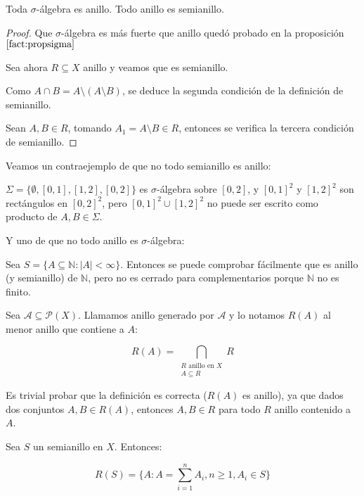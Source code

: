 \begin{fact}
 Toda $\sigma$-álgebra es anillo. Todo anillo es semianillo.
\end{fact}

\begin{proof}
 Que $\sigma$-álgebra es más fuerte que anillo quedó probado en la proposición $\ref{fact:propsigma}$
 
 Sea ahora $R \subseteq X$ anillo y veamos que es semianillo.

 Como $A\cap B = A\setminus (A\setminus B)$, se deduce la segunda condición de la definición de semianillo.
 
 Sean $A, B \in R$, tomando $A_1 = A\setminus B \in R$, entonces se verifica la tercera condición de semianillo.
\end{proof}

\begin{counterex}
 Veamos un contraejemplo de que no todo semianillo es anillo:
 
 $\Sigma = \{\emptyset, [0,1], [1,2], [0,2]\}$ es $\sigma$-álgebra sobre $[0,2]$, y $[0,1]^2$ y $[1,2]^2$ son rectángulos
 en $[0,2]^2$, pero $[0,1]^2 \cup [1,2]^2$ no puede ser escrito como producto de $A,B \in \Sigma$.
 
 Y uno de que no todo anillo es $\sigma$-álgebra:
 
 Sea $S = \{A\subseteq \mathbb{N}: |A| < \infty\}$. Entonces se puede comprobar fácilmente que es anillo (y semianillo)
 de $\mathbb{N}$, pero no es cerrado para complementarios porque $\mathbb{N}$ no es finito.
\end{counterex}


\begin{definition}
 Sea $\mathcal{A} \subseteq \mathcal{P}(X)$. Llamamos anillo generado por $\mathcal{A}$ y lo notamos $R(A)$ al
 menor anillo que contiene a $A$:
 
 \[R(A) = \bigcap_{\begin{array}{c}R \textrm{ anillo en } X\\ A\subseteq R \end{array}} R\]
\end{definition}

Es trivial probar que la definición es correcta ($R(A)$ es anillo), ya que dados dos conjuntos $A,B \in R(A)$, 
entonces $A, B \in R$ para todo $R$ anillo contenido a $A$.

\begin{fact}
 Sea $S$ un semianillo en $X$. Entonces:
 
 \[R(S) = \{A: A=\sum_{i=1}^n A_i, n\ge 1, A_i \in S\}\]
\end{fact}

